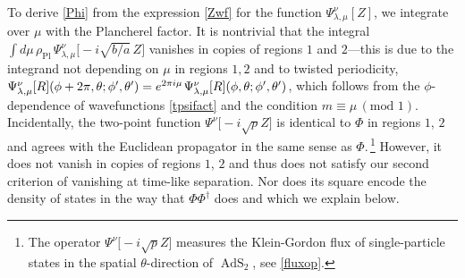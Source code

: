 \documentclass[11pt]{article}
\DeclareMathOperator{\tAdS}{\widetilde{AdS}}
\newcommand{\rPl}{\rho_{\text{Pl}}}
\newcommand{\tht}{\theta}
\newcommand{\lam}{\lambda}
\def\widetilde#1{#1}%
\begin{document}
To derive \eqref{Phi} from the expression \eqref{Zwf} for the function $\Psi^{\nu}_{\lam,\mu}[Z]$, we integrate over $\mu$ with the Plancherel factor. It is nontrivial that the integral $\int d\mu\,\rPl\,\Psi^{\nu}_{\lambda,\mu}\bigl[-i \sqrt{b/a}\,Z\bigr]$ vanishes in copies of regions $1$ and $2$---this is due to the integrand not depending on $\mu$ in regions $1,2$ and to twisted periodicity, $\Psi^{\nu}_{\lambda,\mu}[R](\phi+2\pi,\theta;\phi',\theta') =e^{2\pi i\mu}\kern1pt \Psi^{\nu}_{\lambda,\mu}[R](\phi,\theta;\phi',\theta')$, which follows from the $\phi$-dependence of wavefunctions \eqref{tpsifact} and the condition $m \equiv \mu\,(\text{mod }1)$. Incidentally, the two-point function $\Psi^{\nu}\bigl[-i \sqrt{p}Z\bigr]$ is identical to $\Phi$ in regions $1$, $2$ and  agrees with the Euclidean propagator in the same sense as $\Phi$.\,\footnote{The operator $\Psi^{\nu}\bigl[-i \sqrt{p}Z\bigr]$ measures the Klein-Gordon flux of single-particle states in the spatial $\tht$-direction of $\tAdS_2$, see \eqref{fluxop}.} However, it does not vanish in copies of regions $1$, $2$ and thus does not satisfy our second criterion of vanishing at time-like separation. Nor does its square encode the density of states in the way that $\Phi \Phi^{\dagger}$ does and which we explain below.
\end{document}
